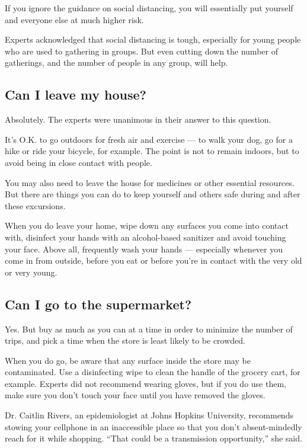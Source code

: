 If you ignore the guidance on social distancing, you will essentially
put yourself and everyone else at much higher risk.

Experts acknowledged that social distancing is tough, especially for
young people who are used to gathering in groups. But even cutting down
the number of gatherings, and the number of people in any group, will
help.

\hypertarget{can-i-leave-my-house}{%
\subsection{Can I leave my house?}\label{can-i-leave-my-house}}

Absolutely. The experts were unanimous in their answer to this question.

It's O.K. to go outdoors for fresh air and exercise --- to walk your
dog, go for a hike or ride your bicycle, for example. The point is not
to remain indoors, but to avoid being in close contact with people.

You may also need to leave the house for medicines or other essential
resources. But there are things you can do to keep yourself and others
safe during and after these excursions.

When you do leave your home, wipe down any surfaces you come into
contact with, disinfect your hands with an alcohol-based sanitizer and
avoid touching your face. Above all, frequently wash your hands ---
especially whenever you come in from outside, before you eat or before
you're in contact with the very old or very young.

\hypertarget{can-i-go-to-the-supermarket}{%
\subsection{Can I go to the
supermarket?}\label{can-i-go-to-the-supermarket}}

Yes. But buy as much as you can at a time in order to minimize the
number of trips, and pick a time when the store is least likely to be
crowded.

When you do go, be aware that any surface inside the store may be
contaminated. Use a disinfecting wipe to clean the handle of the grocery
cart, for example. Experts did not recommend wearing gloves, but if you
do use them, make sure you don't touch your face until you have removed
the gloves.

Dr. Caitlin Rivers, an epidemiologist at Johns Hopkins University,
recommends stowing your cellphone in an inaccessible place so that you
don't absent-mindedly reach for it while shopping. ``That could be a
transmission opportunity,'' she said.

